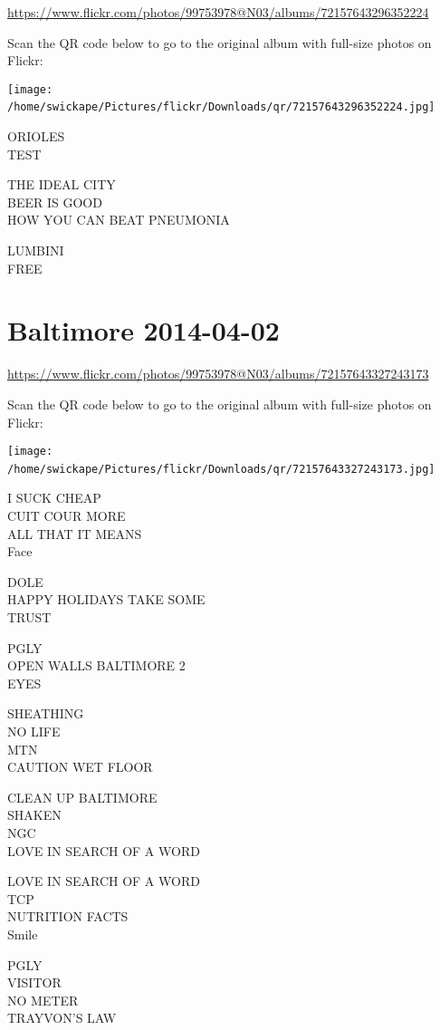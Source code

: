 \documentclass[10pt,letterpaper]{article}
\begin{document}
\url{https://www.flickr.com/photos/99753978@N03/albums/72157643296352224}

Scan the QR code below to go to the original album with full-size photos on Flickr:

\texttt{[image: /home/swickape/Pictures/flickr/Downloads/qr/72157643296352224.jpg]}
\

ORIOLES\\
TEST

THE IDEAL CITY\\
BEER IS GOOD\\
HOW YOU CAN BEAT PNEUMONIA

LUMBINI\\
FREE
\

\section*{Baltimore 2014-04-02}

\url{https://www.flickr.com/photos/99753978@N03/albums/72157643327243173}

Scan the QR code below to go to the original album with full-size photos on Flickr:

\texttt{[image: /home/swickape/Pictures/flickr/Downloads/qr/72157643327243173.jpg]}
\

I SUCK CHEAP\\
CUIT COUR MORE\\
ALL THAT IT MEANS\\
Face

DOLE\\
HAPPY HOLIDAYS TAKE SOME\\
TRUST

PGLY\\
OPEN WALLS BALTIMORE 2\\
EYES

SHEATHING\\
NO LIFE\\
MTN\\
CAUTION WET FLOOR

CLEAN UP BALTIMORE\\
SHAKEN\\
NGC\\
LOVE IN SEARCH OF A WORD

LOVE IN SEARCH OF A WORD\\
TCP\\
NUTRITION FACTS\\
Smile

PGLY\\
VISITOR\\
NO METER\\
TRAYVON'S LAW
\end{document}
